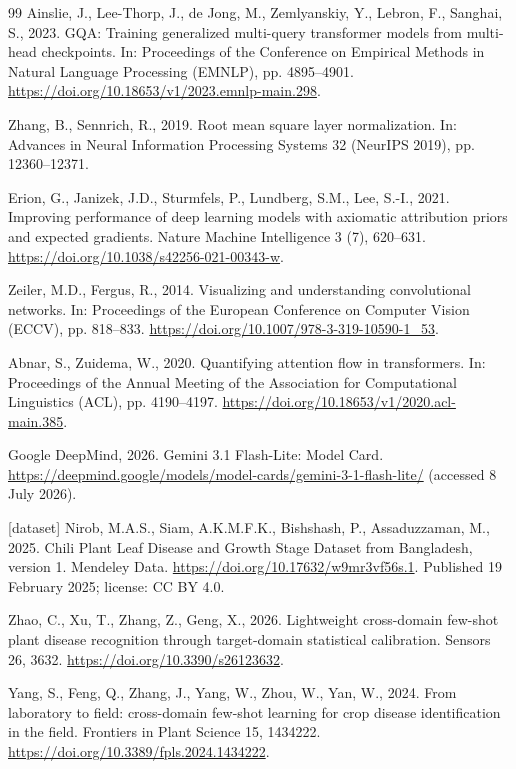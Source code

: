\begin{thebibliography}{99}
Ainslie, J., Lee-Thorp, J., de Jong, M., Zemlyanskiy, Y., Lebron, F., Sanghai, S., 2023. GQA: Training generalized multi-query transformer models from multi-head checkpoints. In: Proceedings of the Conference on Empirical Methods in Natural Language Processing (EMNLP), pp. 4895--4901. \url{https://doi.org/10.18653/v1/2023.emnlp-main.298}.

Zhang, B., Sennrich, R., 2019. Root mean square layer normalization. In: Advances in Neural Information Processing Systems 32 (NeurIPS 2019), pp. 12360--12371.

Erion, G., Janizek, J.D., Sturmfels, P., Lundberg, S.M., Lee, S.-I., 2021. Improving performance of deep learning models with axiomatic attribution priors and expected gradients. Nature Machine Intelligence 3 (7), 620--631. \url{https://doi.org/10.1038/s42256-021-00343-w}.

Zeiler, M.D., Fergus, R., 2014. Visualizing and understanding convolutional networks. In: Proceedings of the European Conference on Computer Vision (ECCV), pp. 818--833. \url{https://doi.org/10.1007/978-3-319-10590-1_53}.

Abnar, S., Zuidema, W., 2020. Quantifying attention flow in transformers. In: Proceedings of the Annual Meeting of the Association for Computational Linguistics (ACL), pp. 4190--4197. \url{https://doi.org/10.18653/v1/2020.acl-main.385}.

Google DeepMind, 2026. Gemini 3.1 Flash-Lite: Model Card. \url{https://deepmind.google/models/model-cards/gemini-3-1-flash-lite/} (accessed 8 July 2026).

{[}dataset{]} Nirob, M.A.S., Siam, A.K.M.F.K., Bishshash, P., Assaduzzaman, M., 2025. Chili Plant Leaf Disease and Growth Stage Dataset from Bangladesh, version 1. Mendeley Data. \url{https://doi.org/10.17632/w9mr3vf56s.1}. Published 19 February 2025; license: CC BY 4.0.

Zhao, C., Xu, T., Zhang, Z., Geng, X., 2026. Lightweight cross-domain few-shot plant disease recognition through target-domain statistical calibration. Sensors 26, 3632. \url{https://doi.org/10.3390/s26123632}.

Yang, S., Feng, Q., Zhang, J., Yang, W., Zhou, W., Yan, W., 2024. From laboratory to field: cross-domain few-shot learning for crop disease identification in the field. Frontiers in Plant Science 15, 1434222. \url{https://doi.org/10.3389/fpls.2024.1434222}.


\end{thebibliography}

